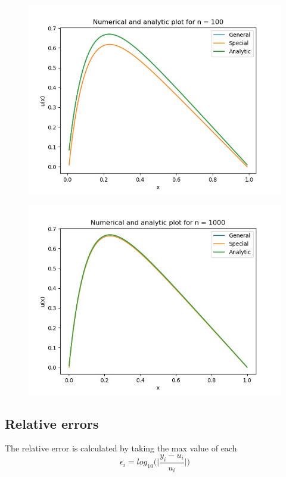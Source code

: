 \documentclass{article}
\begin{document}
\begin{figure}[H]
    \centering
    \includegraphics[scale=0.6]{Project1/plot_n_100.jpg}
\end{figure}

\begin{figure}[H]
    \centering
    \includegraphics[scale=0.6]{Project1/plot_n_1000.jpg}
\end{figure}

\subsection{Relative errors}

The relative error is calculated by taking the max value of each 
$$\epsilon_i = log_{10}\Big(\Big|\frac{y_i - u_i}{u_i}\Big|\Big)$$
\end{document}
